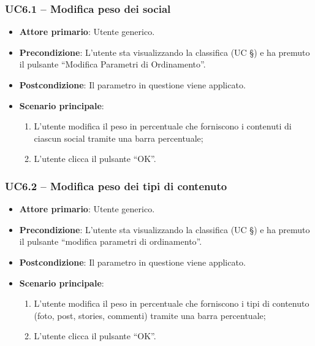 \subsubsection{UC6.1 – Modifica peso dei social }
\begin{itemize}
    \item \textbf{Attore primario}: Utente generico.
    \item \textbf{Precondizione}: L’utente sta visualizzando la classifica (UC §) e ha premuto il pulsante “Modifica Parametri di Ordinamento”.
    \item \textbf{Postcondizione}: Il parametro in questione viene applicato.
    \item \textbf{Scenario principale}: 
    \begin{enumerate}
        \item L’utente modifica il peso in percentuale che forniscono i contenuti di ciascun social tramite una barra percentuale;
        \item L’utente clicca il pulsante “OK”.
    \end{enumerate}
\end{itemize}

\subsubsection{UC6.2 – Modifica peso dei tipi di contenuto}
\begin{itemize}
    \item \textbf{Attore primario}: Utente generico.
    \item \textbf{Precondizione}: L’utente sta visualizzando la classifica (UC §) e ha premuto il pulsante “modifica parametri di ordinamento”.
    \item \textbf{Postcondizione}: Il parametro in questione viene applicato.
    \item \textbf{Scenario principale}: 
    \begin{enumerate}
        \item L’utente modifica il peso in percentuale che forniscono i tipi di contenuto (foto, post, stories, commenti) tramite una barra percentuale;
        \item L’utente clicca il pulsante “OK”.
    \end{enumerate}
\end{itemize}